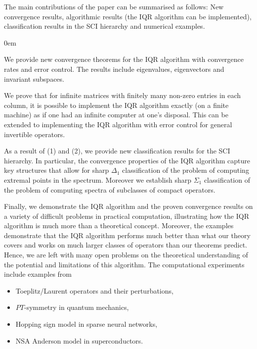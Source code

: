 \documentclass[a4paper,10pt]{article}
\begin{document}
The main contributions of the paper can be summarised as follows: New convergence results, algorithmic results (the IQR algorithm can be implemented), classification results in the SCI hierarchy and numerical examples. 
\begin{labeling}{}
\itemsep0em
\item[\, (1) {\it Convergence results}:] We provide new convergence theorems for the IQR algorithm with convergence rates and error control. The results include eigenvalues, eigenvectors and invariant subspaces. 

\item[\, (2) {\it Algorithmic implementation}:] We prove that for infinite matrices with finitely many non-zero entries in each column, it is possible to implement the IQR algorithm exactly (on a finite machine) as if one had an infinite computer at one's disposal. This can be extended to implementing the IQR algorithm with error control for general invertible operators.
\item[\, (3) {\it SCI hierarchy classifications}:] As a result of (1) and (2), we provide new classification results for the SCI hierarchy. In particular, the convergence properties of the IQR algorithm capture key structures that allow for sharp $\Delta_1$ classification of the problem of computing extremal points in the spectrum. Moreover we establish sharp $\Sigma_1$ classification of the problem of computing spectra of subclasses of compact operators. 
\item[\, (4) {\it Numerical examples}:] Finally, we demonstrate the IQR algorithm and the proven convergence results on a variety of difficult problems in practical computation, illustrating how the IQR algorithm is much more than a theoretical concept. Moreover, the examples demonstrate that the IQR algorithm performs much better than what our theory covers and works on much larger classes of operators than our theorems predict. Hence, we are left with many open problems on the theoretical understanding of the potential and limitations of this algorithm. The computational experiments include examples from
\begin{itemize}
\item[(i)] Toeplitz/Laurent operators and their perturbations,
\item[(ii)] $PT$-symmetry in quantum mechanics,
\item[(iii)] Hopping sign model in sparse neural networks,
\item[(iv)] NSA Anderson model in superconductors.
\end{itemize}
\end{labeling}
\end{document}
